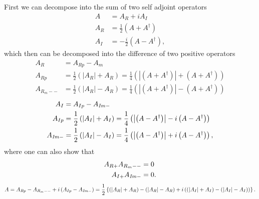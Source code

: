 \documentclass[aps,preprint]{revtex4}%
\begin{document}
First we can decompose into the sum of two self adjoint operators
\begin{align}
A &  =A_{R}+iA_{I}\\
A_{R} &  =\frac{1}{2}\left(  A+A^{\dagger}\right)  \\
A_{I} &  =-\frac{i}{2}\left(  A-A^{\dagger}\right)  ,
\end{align}
which then can be decomposed into the difference of two positive operators%
\begin{align}
A_{R} &  =A_{Rp}-A_{m}\\
A_{Rp} &  =\frac{1}{2}\left(  \left\vert A_{R}\right\vert +A_{R}\right)
=\frac{1}{4}\left(  \left\vert \left(  A+A^{\dagger}\right)  \right\vert
+\left(  A+A^{\dagger}\right)  \right)  \\
A_{R_{m}--} &  =\frac{1}{2}\left(  \left\vert A_{R}\right\vert -A_{R}\right)
=\frac{1}{4}\left(  \left\vert \left(  A+A^{\dagger}\right)  \right\vert
-\left(  A+A^{\dagger}\right)  \right)
\end{align}%
\begin{align}
A_{I} &  =A_{Ip}-A_{\text{\textit{Im}}-}\\
A_{Ip} &  =\frac{1}{2}\left(  \left\vert A_{I}\right\vert +A_{I}\right)
=\frac{1}{4}\left(  \left\vert \left(  A-A^{\dagger}\right)  \right\vert
-i\left(  A-A^{\dagger}\right)  \right)  \\
A_{\text{\textit{Im}}-} &  =\frac{1}{2}\left(  \left\vert A_{I}\right\vert
-A_{I}\right)  =\frac{1}{4}\left(  \left\vert \left(  A-A^{\dagger}\right)
\right\vert +i\left(  A-A^{\dagger}\right)  \right)  ,
\end{align}
where one can also show that
\begin{align}
A_{R+}A_{R_{m}--} &  =0\\
A_{I+}A_{\text{\textit{Im}}-} &  =0.
\end{align}%
\begin{equation}
A=A_{Rp}-A_{R_{m}--}+i\left(  A_{Ip}-A_{\text{\textit{Im}}-}\right)  =\frac
{1}{2}\left\{  \left(  \left\vert A_{R}\right\vert +A_{R}\right)  -\left(
\left\vert A_{R}\right\vert -A_{R}\right)  +i\left(  \left(  \left\vert
A_{I}\right\vert +A_{I}\right)  -\left(  \left\vert A_{I}\right\vert
-A_{I}\right)  \right)  \right\}  .
\end{equation}
\end{document}
